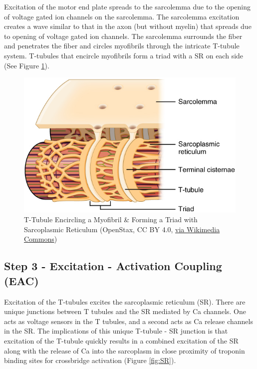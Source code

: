 Excitation of the motor end plate spreads to the sarcolemma due to the opening of voltage gated ion channels on the sarcolemma. The sarcolemma excitation creates a wave similar to that in the axon (but without myelin) that spreads due to opening of voltage gated ion channels. The sarcolemma surrounds the fiber and penetrates the fiber and circles myofibrils through the intricate T-tubule system. T-tubules that encircle myofibrils form a triad with a SR on each side (See Figure \ref{fig:T-tubule}).


\begin{figure}[!ht]
    \centering
    \includegraphics[width=1\linewidth]{./figure/T-tubule.jpg}
    \caption{T-Tubule Encircling a Myofibril \& Forming a Triad with Sarcoplasmic Reticulum  \footnotesize{(OpenStax, CC BY 4.0, \href{https://creativecommons.org/licenses/by/4.0}{via Wikimedia Commons})}}
    \label{fig:T-tubule}
\end{figure}

\subsection{Step 3 - Excitation - Activation Coupling (EAC)}
Excitation of the T-tubules excites the sarcoplasmic reticulum (SR). There are unique junctions between T tubules and the SR mediated by Ca channels. One acts as voltage sensors in the T tubules, and a second acts as Ca release channels in the SR.\footnotemark{} The implications of this unique T-tubule - SR junction is that excitation of the T-tubule quickly results in a combined excitation of the SR along with the release of Ca into the sarcoplasm\footnotemark{} in close proximity of troponin binding sites for crossbridge activation (Figure \ref{fig:SR}).

